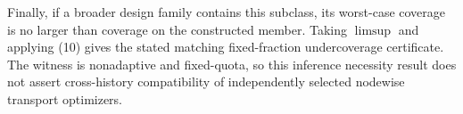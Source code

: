 Finally, if a broader design family contains this subclass, its worst-case coverage is no larger than coverage on the constructed member. Taking \(\limsup\) and applying (10) gives the stated matching fixed-fraction undercoverage certificate. The witness is nonadaptive and fixed-quota, so this inference necessity result does not assert cross-history compatibility of independently selected nodewise transport optimizers.